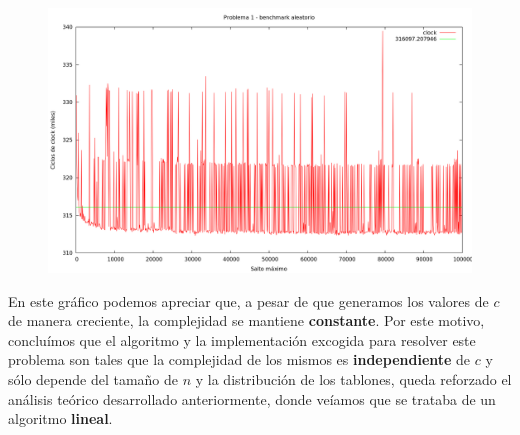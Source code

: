 \begin{figure}[h]
  \begin{center}
    \includegraphics[scale=0.35]{imagenes/grafico-1-c.png}
  \end{center}
\end{figure}


En este gráfico podemos apreciar que, a pesar de que generamos los valores de $c$ de manera creciente, la complejidad
se mantiene \textbf{constante}. Por este motivo, concluímos que el algoritmo y la implementación excogida para resolver este
problema son tales que la complejidad de los mismos es \textbf{independiente} de $c$ y sólo depende del tamaño de $n$ y la 
distribución de los tablones, queda reforzado el análisis teórico desarrollado anteriormente, donde veíamos que se trataba de 
un algoritmo \textbf{lineal}.
